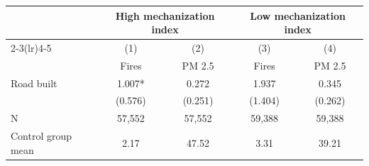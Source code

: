 {
\def\sym#1{\ifmmode^{#1}\else\(^{#1}\)\fi}
\begin{tabular}{l*{4}{c}}
\hline\hline
                         &\multicolumn{2}{c}{High mechanization index}&\multicolumn{2}{c}{Low mechanization index}\\\cmidrule(lr){2-3}\cmidrule(lr){4-5}
                         &\multicolumn{1}{c}{(1)}&\multicolumn{1}{c}{(2)}&\multicolumn{1}{c}{(3)}&\multicolumn{1}{c}{(4)}\\
                         &\multicolumn{1}{c}{Fires}&\multicolumn{1}{c}{PM 2.5}&\multicolumn{1}{c}{Fires}&\multicolumn{1}{c}{PM 2.5}\\
\hline
Road built               &       1.007*  &       0.272   &       1.937   &       0.345   \\
                         &     (0.576)   &     (0.251)   &     (1.404)   &     (0.262)   \\
\hline
N                        &      57,552   &      57,552   &      59,388   &      59,388   \\
Control group mean       &        2.17   &       47.52   &        3.31   &       39.21   \\
\hline\hline
\end{tabular}
}

